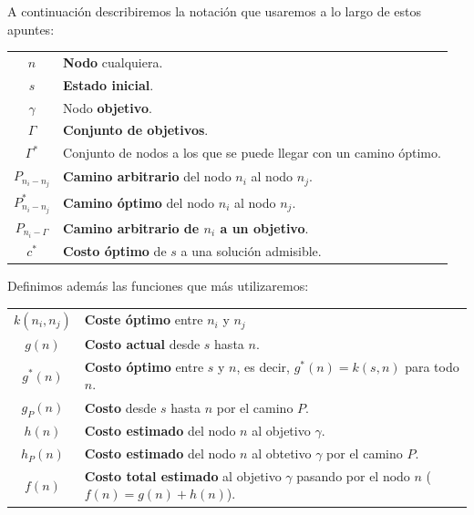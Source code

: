 \begin{notacion}
    A continuación describiremos la notación que usaremos a lo largo de estos apuntes:
    \begin{center}
        \begin{tabular}{c | l}
            $n$ & \textbf{Nodo} cualquiera.\\
            $s$ & \textbf{Estado inicial}. \\
            $\gamma$ & Nodo \textbf{objetivo}.\\
            $\Gamma$ & \textbf{Conjunto de objetivos}.\\
            $\Gamma^*$ & Conjunto de nodos a los que se puede llegar con un camino óptimo.\\
            $P_{n_i-n_j}$ & \textbf{Camino arbitrario} del nodo $n_i$ al nodo $n_j$.\\
            $P^*_{n_i-n_j}$ & \textbf{Camino óptimo} del nodo $n_i$ al nodo $n_j$.\\
            $P_{n_i-\Gamma}$ & \textbf{Camino arbitrario de $n_i$ a un objetivo}.\\
            $c^*$ & \textbf{Costo óptimo} de $s$ a una solución admisible.
        \end{tabular}
    \end{center}
    Definimos además las funciones que más utilizaremos:
    \begin{center}%
        \begin{tabular}{c | l}%
            $k(n_i, n_j)$ & \textbf{Coste óptimo} entre $n_i$ y $n_j$ \\
            $g(n)$ & \textbf{Costo actual} desde $s$ hasta $n$.\\
            $g^*(n)$ & \textbf{Costo óptimo} entre $s$ y $n$, es decir, $g^*(n) = k(s,n)$ para todo $n$.\\
            $g_P(n)$ & \textbf{Costo} desde $s$ hasta $n$ por el camino $P$.\\
            $h(n)$ & \textbf{Costo estimado} del nodo $n$ al objetivo $\gamma$.\\
            $h_P(n)$ & \textbf{Costo estimado} del nodo $n$ al obtetivo $   \gamma$ por el camino $P$.\\
            $f(n)$ & \textbf{Costo total estimado} al objetivo $\gamma$ pasando por el nodo $n$ ($f(n)=g(n)+h(n)$).
        \end{tabular}
    \end{center}
\end{notacion}

